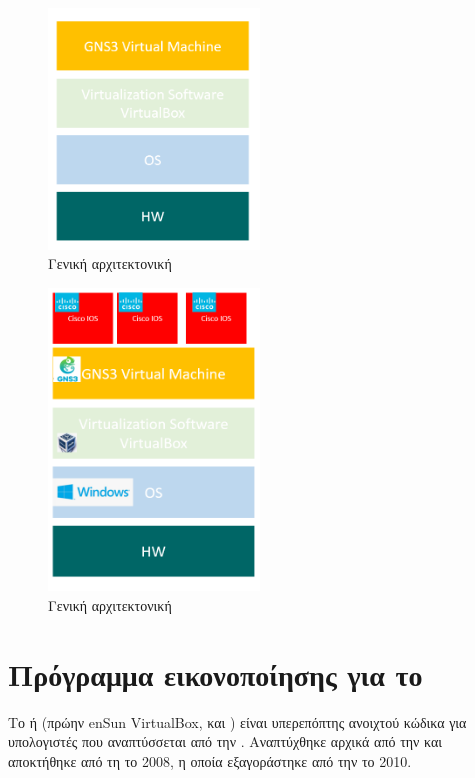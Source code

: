 \begin{figure}[htb]
	\centering
	\includegraphics[width=0.5\textwidth]{graphics/Architecture_virtualbox.PNG}
	\caption{ Γενική αρχιτεκτονική}
\end{figure}

\begin{figure}[htb]
	\centering
	\includegraphics[width=0.5\textwidth]{graphics/virtualization_architecture.PNG}
	\caption{ Γενική αρχιτεκτονική}
\end{figure}

\section{Πρόγραμμα εικονοποίησης για το }

Το  ή  (πρώην en{Sun VirtualBox},  και ) είναι υπερεπόπτης
ανοιχτού κώδικα για υπολογιστές  που αναπτύσσεται από την .
Αναπτύχθηκε αρχικά από την 
και αποκτήθηκε από τη  το 2008, η οποία εξαγοράστηκε από την  το 2010.

